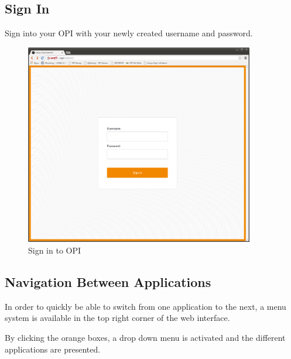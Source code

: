 \documentclass[12pt,a4paper,titlepage]{article}
\begin{document}
\subsection{Sign In}
Sign into your OPI with your newly created username and password. 
\begin{figure}[h]
\centering
\includegraphics[width=10cm]{./img/sign-in}
\caption{Sign in to OPI}
\end{figure}

\newpage
\subsection{Navigation Between Applications}
In order to quickly be able to switch from one application to the next, a menu system is available in the top right corner of the web interface.

By clicking the orange boxes, a drop down menu is activated and the different applications are presented. 
\end{document}
